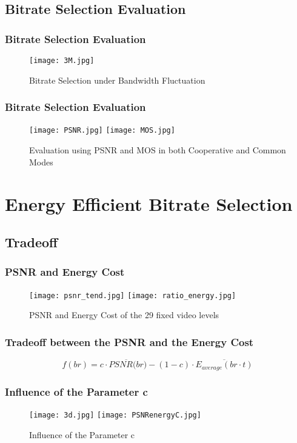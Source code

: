 \documentclass[table]{beamer}
\begin{document}
\subsection{Bitrate Selection Evaluation}
\begin{frame}
	\frametitle{Bitrate Selection Evaluation}
	\begin{figure}[htbp]
    \centering
		\texttt{[image: 3M.jpg]}
    \caption{Bitrate Selection under Bandwidth Fluctuation}
    \label{fig:bitrate}
    \end{figure}
\end{frame}

\begin{frame}
	\frametitle{Bitrate Selection Evaluation}
	\begin{figure}[htbp]
    \centering
		\texttt{[image: PSNR.jpg]}
		\texttt{[image: MOS.jpg]}
    \caption{Evaluation using PSNR and MOS in both Cooperative and Common Modes}
    \label{fig:power}
    \end{figure}
\end{frame}

\section{Energy Efficient Bitrate Selection}
\subsection{Tradeoff}
\begin{frame}
	\frametitle{PSNR and Energy Cost}
	\begin{figure}[htbp]
    \centering
		\texttt{[image: psnr\_tend.jpg]}
		\texttt{[image: ratio\_energy.jpg]}
    \caption{PSNR and Energy Cost of the 29 fixed video levels}
    \label{fig:psnrenergy}
    \end{figure}
\end{frame}

\begin{frame}
	\frametitle{Tradeoff between the PSNR and the Energy Cost}
	\begin{equation}
	f(br)=c\cdot\overline{PSNR(br})-(1-c)\cdot\overline{E_{average}(br\cdot t)}
	\label{Constraint Function}
	\end{equation}
\end{frame}

\begin{frame}
	\frametitle{Influence of the Parameter c}
	\begin{figure}[htbp]
    \centering
		\texttt{[image: 3d.jpg]}
		\texttt{[image: PSNRenergyC.jpg]}
    \caption{Influence of the Parameter c}
    \label{fig:c}
    \end{figure}
\end{frame}
\end{document}
